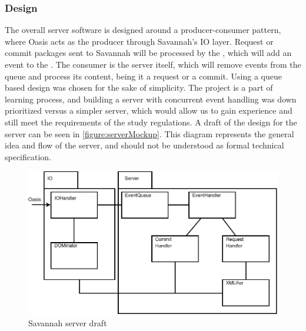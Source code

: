\subsubsection*{Design}
The overall server software is designed around a producer-consumer pattern, where Oasis acts as the producer through Savannah's IO layer.
Request or commit packages sent to Savannah will be processed by the , which will add an event to the . The consumer is the server itself, which will remove events from the queue and process its content, being it a request or a commit. Using a queue based design was chosen for the sake of simplicity. The project is a part of learning process, and building a server with concurrent event handling was down prioritized versus a simpler server, which would allow us to gain experience and still meet the requirements of the study regulations.
 A draft of the design for the server can be seen in \autoref{figure:serverMockup}. This diagram represents the general idea and flow of the server, and should not be understood as formal technical specification.
\begin{figure}[H]
 \centering
  \includegraphics[scale=1]{images/savaIniDesign}
 \caption{Savannah server draft}
 \label{figure:serverMockup}
\end{figure}
